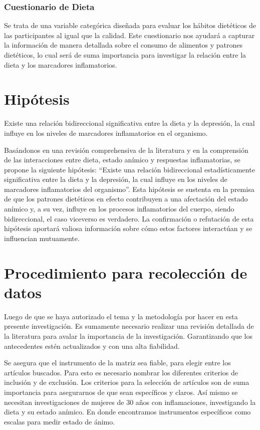 \documentclass[jou]{apa7}
\begin{document}
	\subsubsection{Cuestionario de Dieta}
	Se trata de una variable categórica diseñada para evaluar los hábitos dietéticos de las participantes al igual que la calidad. Este cuestionario nos ayudará a capturar la información de manera detallada sobre el consumo de alimentos y patrones dietéticos, lo cual será de suma importancia para investigar la relación entre la dieta y los marcadores inflamatorios.
	
	
	\section{Hipótesis}\label{hipuxf3tesis}
	
	Existe una relación bidireccional significativa entre la dieta y la
	depresión, la cual influye en los niveles de marcadores inflamatorios en
	el organismo.
	
	Basándonos en una revisión comprehensiva de la literatura y en la
	comprensión de las interacciones entre dieta, estado anímico y
	respuestas inflamatorias, se propone la siguiente hipótesis: ``Existe una
	relación bidireccional estadísticamente significativa entre la dieta y
	la depresión, la cual influye en los niveles de marcadores inflamatorios
	del organismo''. Esta hipótesis se sustenta en la premisa de que los
	patrones dietéticos en efecto contribuyen a una afectación del estado
	anímico y, a su vez, influye en los procesos inflamatorios del cuerpo,
	siendo bidireccional, el caso viceverso es verdadero. La confirmación o
	refutación de esta hipótesis aportará valiosa información sobre cómo
	estos factores interactúan y se influencian mutuamente.
	
	\section{Procedimiento para recolección de
		datos}\label{procedimiento-para-recolecciuxf3n-de-datos}
	
	Luego de que se haya autorizado el tema y la metodología por hacer en
	esta presente investigación. Es sumamente necesario realizar una
	revisión detallada de la literatura para avalar la importancia de la
	investigación. Garantizando que los antecedentes estén actualizados y
	con una alta fiabilidad.
	
	
	Se asegura  que el instrumento de la matriz sea fiable, para elegir entre los artículos buscados. Para esto es necesario nombrar los diferentes criterios de inclusión y de exclusión. Los criterios para la selección de artículos son de suma importancia para asegurarnos de que sean específicos y claros. Así mismo se necesitan  investigaciones de mujeres de 30 años con inflamaciones, investigando la dieta y su estado anímico. En donde encontramos instrumentos específicos como escalas para medir estado de ánimo. 
	
\end{document}
